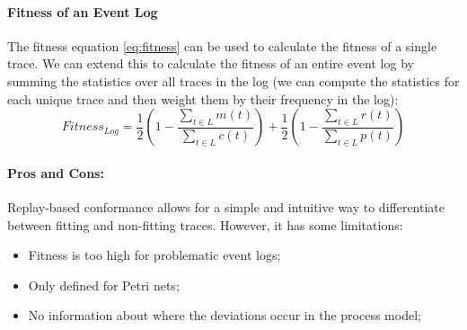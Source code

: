 \paragraph{Fitness of an Event Log}
The fitness equation \ref{eq:fitness} can be used to calculate the fitness of a single trace.
We can extend this to calculate the fitness of an entire event log by summing the statistics over all traces in the log (we can compute the statistics for each unique trace and then weight them by their frequency in the log):
\begin{equation}
    \label{eq:logfitness}
    Fitness_{Log} = \frac{1}{2} (1 - \frac{\sum_{t \in L} m(t)}{\sum_{t \in L} c(t)}) + \frac{1}{2} (1 - \frac{\sum_{t \in L} r(t)}{\sum_{t \in L} p(t)})
\end{equation}

\paragraph{Pros and Cons:}
Replay-based conformance allows for a simple and intuitive way to differentiate between fitting and non-fitting traces.
However, it has some limitations:
\begin{itemize}
    \item Fitness is too high for problematic event logs;
    \item Only defined for Petri nets;
    \item No information about where the deviations occur in the process model;
\end{itemize}

